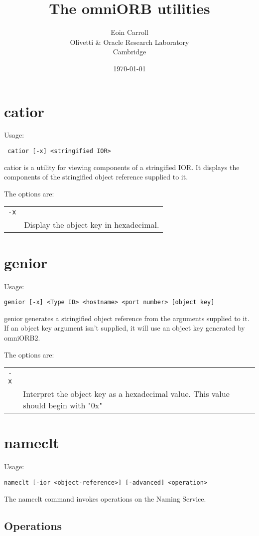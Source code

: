 \documentclass[11pt,twoside,onecolumn]{article}
\title{The omniORB utilities}
\author{Eoin Carroll\\
Olivetti \& Oracle Research Laboratory\\
Cambridge}
\date{\today}
\begin{document}
\maketitle

\section{catior}
Usage:
 \begin{verbatim} catior [-x] <stringified IOR> \end{verbatim}

catior is a utility for viewing components of a stringified IOR.
It displays the components of the stringified object reference
supplied to it. 

The options are:


\begin{tabular}{ll}
\verb.-x. \\
  & Display the object key in hexadecimal.
\end{tabular}


\section{genior}
Usage: 
\begin{verbatim}genior [-x] <Type ID> <hostname> <port number> [object key] \end{verbatim}

genior generates a stringified object reference
from the arguments supplied to it.
If an object key argument isn't supplied, it will
use an object key generated by omniORB2.

The options are:


\begin{tabular}{ll}
\verb.-x. \\
 & Interpret the object key as a hexadecimal value. This 
value should begin with "0x"
\end{tabular}


\section{nameclt}
Usage: 
\begin{verbatim}nameclt [-ior <object-reference>] [-advanced] <operation> 
\end{verbatim}

The nameclt command invokes operations on the Naming Service.  

\subsection{Operations}
\end{document}
